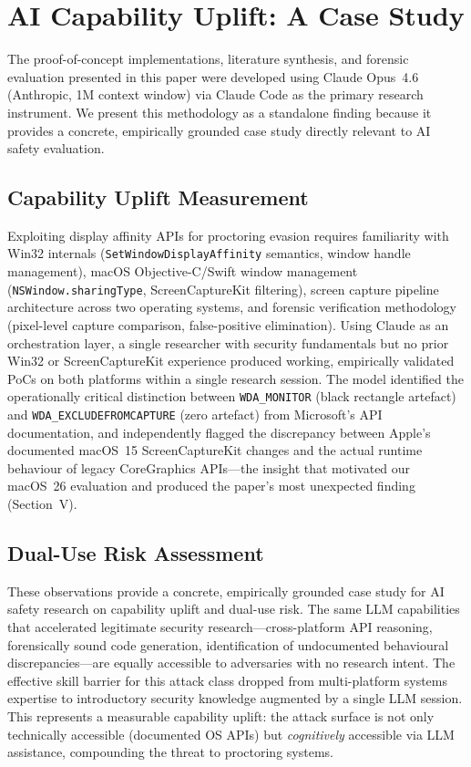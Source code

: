 \documentclass[conference]{IEEEtran}
\begin{document}
\section{AI Capability Uplift: A Case Study}

The proof-of-concept implementations, literature synthesis, and forensic evaluation presented in this paper were developed using Claude Opus~4.6 (Anthropic, 1M context window) via Claude Code as the primary research instrument. We present this methodology as a standalone finding because it provides a concrete, empirically grounded case study directly relevant to AI safety evaluation.

\subsection{Capability Uplift Measurement}

Exploiting display affinity APIs for proctoring evasion requires familiarity with Win32 internals (\texttt{SetWindowDisplayAffinity} semantics, window handle management), macOS Objective-C/Swift window management (\texttt{NSWindow.sharingType}, ScreenCaptureKit filtering), screen capture pipeline architecture across two operating systems, and forensic verification methodology (pixel-level capture comparison, false-positive elimination). Using Claude as an orchestration layer, a single researcher with security fundamentals but no prior Win32 or ScreenCaptureKit experience produced working, empirically validated PoCs on both platforms within a single research session. The model identified the operationally critical distinction between \texttt{WDA\_MONITOR} (black rectangle artefact) and \texttt{WDA\_EXCLUDEFROMCAPTURE} (zero artefact) from Microsoft's API documentation, and independently flagged the discrepancy between Apple's documented macOS~15 ScreenCaptureKit changes and the actual runtime behaviour of legacy CoreGraphics APIs---the insight that motivated our macOS~26 evaluation and produced the paper's most unexpected finding (Section~V).

\subsection{Dual-Use Risk Assessment}

These observations provide a concrete, empirically grounded case study for AI safety research on capability uplift and dual-use risk. The same LLM capabilities that accelerated legitimate security research---cross-platform API reasoning, forensically sound code generation, identification of undocumented behavioural discrepancies---are equally accessible to adversaries with no research intent. The effective skill barrier for this attack class dropped from multi-platform systems expertise to introductory security knowledge augmented by a single LLM session. This represents a measurable capability uplift: the attack surface is not only technically accessible (documented OS APIs) but \textit{cognitively} accessible via LLM assistance, compounding the threat to proctoring systems.
\end{document}
